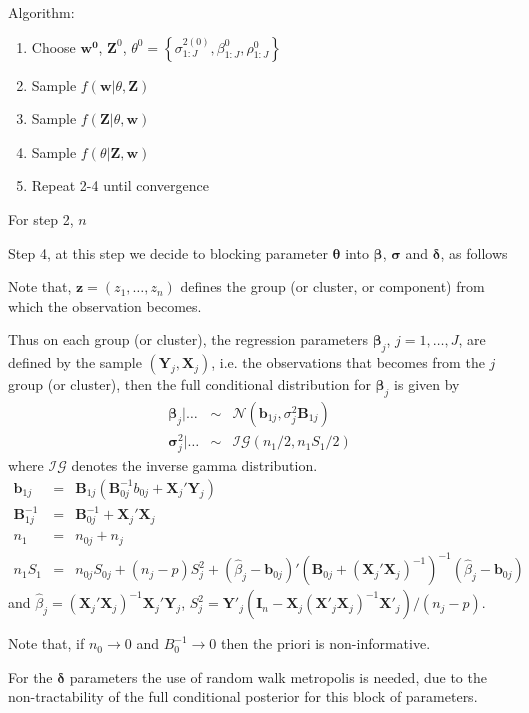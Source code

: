 \documentclass[11pt,letterpaper]{article}
\begin{document}
Algorithm:
\begin{enumerate}
    \item Choose $\mathbf{w^0}$, $\mathbf{Z}^0$, $\theta^0 = \left\{ \sigma^{2(0)}_{1:J}, \beta_{1:J}^0, \rho_{1:J}^0 \right\}$
    \item Sample $f( \mathbf{w} | \theta, \mathbf{Z} )$
    \item Sample $f( \mathbf{Z} | \theta, \mathbf{w} )$
    \item Sample $f( \theta | \mathbf{Z}, \mathbf{w})$
    \item Repeat 2-4 until convergence
\end{enumerate}

For step 2, $n$ 

Step 4, at this step we decide to blocking parameter $\mathbf \theta$ into $\mathbf \beta$, $\mathbf \sigma$ and $\mathbf \delta$, as follows

Note that, $\mathbf z = (z_1,\ldots , z_n)$ defines the group (or cluster, or component) from which the observation becomes.

Thus on each group (or cluster), the regression parameters $\mathbf \beta_j$, $j=1,\ldots,J$, are defined by the sample $(\mathbf Y_j ,\mathbf X_j)$, i.e. the observations that becomes from the $j$ group (or cluster), then the full conditional distribution for $\mathbf \beta_j$ is given by
\begin{eqnarray*}
    \mathbf{ \beta}_j | \ldots  &\sim &\mathcal{N}( \mathbf b_{1j}, \sigma^2_j \mathbf B_{1j})\\
    \mathbf \sigma^2_j | \ldots & \sim &\mathcal{IG}( n_1 / 2 , n_1S_1/2)
\end{eqnarray*}
where $\mathcal{IG}$ denotes the inverse gamma distribution.
\begin{eqnarray*}
\mathbf b_{1j} &=& \mathbf B_{1j} ( \mathbf B^{-1}_{0j}b_{0j} + \mathbf X_{j}' \mathbf Y_{j} )\\
\mathbf B_{1j}^{-1} &=& \mathbf B_{0j}^{-1} + \mathbf X_{j}'  \mathbf X_{j}\\
n_1 &=& n_{0j} + n_j\\
n_1 S_1 &=& n_{0j} S_{0j} + (n_j - p ) S_j^2 + (\hat{\beta}_j - \mathbf b_{0j})' (\mathbf B_{0j} + (\mathbf X_{j}'  \mathbf X_{j})^{-1})^{-1} (\hat{\beta}_j - \mathbf b_{0j})
\end{eqnarray*}
and $\hat{\beta}_j = (\mathbf X_{j}' \mathbf X_{j})^{-1} \mathbf X_{j}' \mathbf Y_{j} $, $S_j^2 = \mathbf Y'_j(\mathbf I_n - \mathbf X_j (\mathbf X'_j \mathbf X_j)^{-1} \mathbf X'_j)/(n_j - p)$.

Note that, if $n_0\rightarrow 0$ and $B_0^{-1} \rightarrow 0$ then the priori is non-informative.

For the $\mathbf \delta$ parameters the use of random walk metropolis is needed, due to the non-tractability of the full conditional posterior for this block of parameters.
\end{document}
